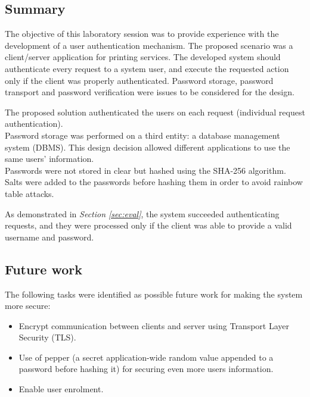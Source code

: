 \subsection{Summary}
The objective of this laboratory session was to provide experience with the development of a user authentication mechanism. The proposed scenario was a client/server application for printing services. The developed system should authenticate every request to a system user, and execute the requested action only if the client was properly authenticated. Password storage, password transport and password verification were issues to be considered for the design.

The proposed solution authenticated the users on each request (individual request authentication).\\
Password storage was performed on a third entity: a database management system (DBMS). This design decision allowed different applications to use the same users' information.\\
Passwords were not stored in clear but hashed using the SHA-256 algorithm. Salts were added to the passwords before hashing them in order to avoid rainbow table attacks.

As demonstrated in \textit{Section \ref{sec:eval}}, the system succeeded authenticating requests, and they were processed only if the client was able to provide a valid username and password.
\subsection{Future work}
The following tasks were identified as possible future work for making the system more secure:
\begin{itemize}
	\item Encrypt communication between clients and server using Transport Layer Security (TLS).
	\item Use of pepper (a secret application-wide random value appended to a password before hashing it) for securing even more users information.
	\item Enable user enrolment.
\end{itemize}